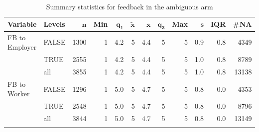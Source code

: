 {\footnotesize
\begin{longtable}{llrrrrrrrrrr}
\caption{Summary statistics for feedback in the ambiguous arm} \\ 
 \textbf{Variable} & \textbf{Levels} & $\mathbf{n}$ & \textbf{Min} & $\mathbf{q_1}$ & $\mathbf{\widetilde{x}}$ & $\mathbf{\bar{x}}$ & $\mathbf{q_3}$ & \textbf{Max} & $\mathbf{s}$ & \textbf{IQR} & \textbf{\#NA} \\ 
  \hline
FB to Employer & FALSE & 1300 & 1 & 4.2 & 5 & 4.4 & 5 & 5 & 0.9 & 0.8 &  4349 \\ 
   & TRUE & 2555 & 1 & 4.2 & 5 & 4.4 & 5 & 5 & 1.0 & 0.8 &  8789 \\ 
   \hline
 & all & 3855 & 1 & 4.2 & 5 & 4.4 & 5 & 5 & 1.0 & 0.8 & 13138 \\ 
   \hline
FB to Worker & FALSE & 1296 & 1 & 5.0 & 5 & 4.7 & 5 & 5 & 0.8 & 0.0 &  4353 \\ 
   & TRUE & 2548 & 1 & 5.0 & 5 & 4.7 & 5 & 5 & 0.8 & 0.0 &  8796 \\ 
   \hline
 & all & 3844 & 1 & 5.0 & 5 & 4.7 & 5 & 5 & 0.8 & 0.0 & 13149 \\ 
   \hline
\hline
\label{}
\end{longtable}
}

